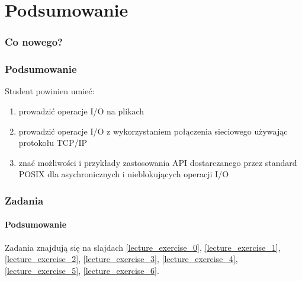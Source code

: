 \documentclass[aspectratio=169]{beamer}
\begin{document}
\section{Podsumowanie}

\begin{frame}
    \frametitle{Co nowego?}
    \frametitle{Podsumowanie}

    Student powinien umieć:

    \begin{enumerate}
        \item prowadzić operacje I/O na plikach
        \item prowadzić operacje I/O z wykorzystaniem połączenia sieciowego
            używając protokołu TCP/IP
        \item znać możliwości i przykłady zastosowania API dostarczanego przez
            standard POSIX dla asychronicznych i nieblokujących operacji I/O
    \end{enumerate}
\end{frame}

\begin{frame}
    \frametitle{Zadania}
    \framesubtitle{Podsumowanie}

    Zadania znajdują się na slajdach
    \ref{lecture_exercise_0},
    \ref{lecture_exercise_1},
    \ref{lecture_exercise_2},
    \ref{lecture_exercise_3},
    \ref{lecture_exercise_4},
    \ref{lecture_exercise_5},
    \ref{lecture_exercise_6}.
\end{frame}
\end{document}
